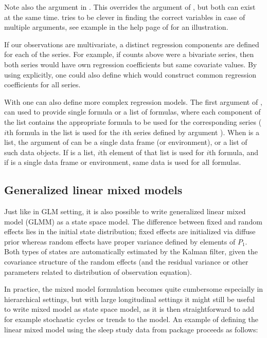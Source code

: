 \documentclass[nojss,article]{jss}\usepackage[]{graphicx}\usepackage[]{color}
\begin{document}
Note also the  argument in . This overrides the  argument of , but both can exist at the same time.  tries to be clever in finding the correct variables in case of multiple  arguments, see example in the help page of  for an illustration.

If our observations are multivariate, a distinct regression components are defined for each of the series. For example, if counts  above were a bivariate series, then both series would have own regression coefficients but same covariate values. By using  explicitly, one could also define  which would construct common regression coefficients for all series.

With  one can also define more complex regression models. The first argument of ,  can used to provide single formula or a list of formulas, where each component of the list contains the appropriate formula to be used for the corresponding series ($i$th formula in the list is used for the $i$th series defined by argument ). When  is a list, the  argument of  can be a single data frame (or environment), or a list of such data objects. If  is a list, $i$th element of that list is used for $i$th formula, and if  is a single data frame or environment, same data is used for all formulas.

\subsection{Generalized linear mixed models}

Just like in GLM setting, it is also possible to write generalized linear mixed model (GLMM) as a state space model. The difference between fixed and random effects lies in the initial state distribution; fixed effects are initialized via diffuse prior whereas random effects have proper variance defined by elements of $P_1$. Both types of states are automatically estimated by the Kalman filter, given the covariance structure of the random effects (and the residual variance or other parameters related to distribution of observation equation).

In practice, the mixed model formulation becomes quite cumbersome especially in hierarchical settings, but with large longitudinal settings it might still be useful to write mixed model as state space model, as it is then straightforward to add for example stochastic cycles or trends to the model. An example of defining the linear mixed model using the sleep study data from  \citep{lme4article,lme4} package proceeds as follows:
\end{document}

